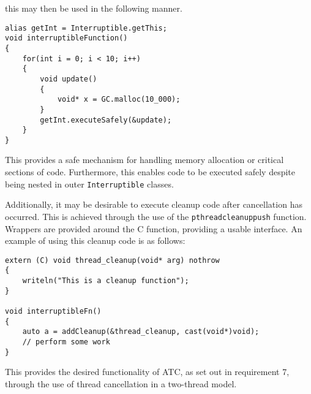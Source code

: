 this may then be used in the following manner. 
\begin{lstlisting}[basicstyle=\small]
alias getInt = Interruptible.getThis;
void interruptibleFunction() 
{
    for(int i = 0; i < 10; i++)
    {
        void update() 
        {
            void* x = GC.malloc(10_000); 
        }
        getInt.executeSafely(&update);
    }
}
\end{lstlisting}
This provides a safe mechanism for handling memory allocation or critical sections 
of code. Furthermore, this enables code to be executed safely despite being 
nested in outer \texttt{Interruptible} classes. 
\par\bigskip\noindent
Additionally, it may be desirable to execute cleanup code after cancellation 
has occurred. This is achieved through the use of the 
\texttt{pthread\textunderscore{}cleanup\textunderscore{}push} function. 
Wrappers are provided around the C function, providing a usable interface. An 
example of using this cleanup code is as follows: 
\begin{lstlisting}[basicstyle=\small]
extern (C) void thread_cleanup(void* arg) nothrow
{
    writeln("This is a cleanup function");
}

void interruptibleFn()
{
    auto a = addCleanup(&thread_cleanup, cast(void*)void);
    // perform some work
}
\end{lstlisting}
This provides the desired functionality of ATC, as set out in requirement 7, 
through the use of thread cancellation in a two-thread model.

